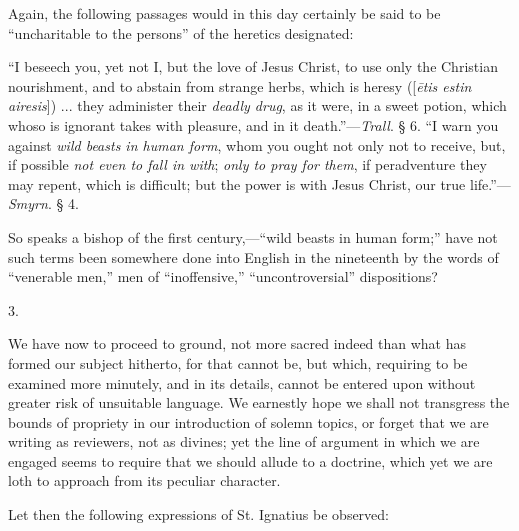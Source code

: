 Again, the following passages would in this day
certainly be said to be ``uncharitable to the persons'' of the heretics
designated:

``I
beseech you, yet not I, but the love of Jesus Christ, to use only the
Christian nourishment, and to abstain from strange herbs, which is
heresy ([\emph{\={e}tis estin airesis}]) ... they administer their \emph{deadly
drug}, as it were, in a sweet potion, which whoso is ignorant takes
with pleasure, and in it death.''—\emph{Trall}. § 6. ``I warn you
against \emph{wild beasts in human form}, whom you ought not only not
to receive, but, if possible \emph{not even to fall in with}; \emph{only
to pray for them}, if peradventure they may repent, which is
difficult; but the power is with Jesus Christ, our true life.''—\emph{Smyrn}.
§ 4.

So speaks a bishop of the first century,—``wild
beasts in human form;'' have not such terms been somewhere done into
English in the nineteenth by the words of ``venerable men,'' men of ``inoffensive,''
``uncontroversial'' dispositions?

3.

We have now to proceed to ground, not more sacred
indeed than what has formed our subject hitherto, for that cannot be,
but which, requiring to be examined more minutely, and in its details,
cannot be entered upon without greater risk of unsuitable language. We
earnestly hope we shall not transgress the bounds of propriety in our
introduction of solemn topics, or forget that we are writing as
reviewers, not as divines; yet the line of argument in which we are
engaged seems to require that we should allude to a doctrine, which
yet we are loth to approach from its peculiar character.

Let then the following expressions of St.
Ignatius be observed:

